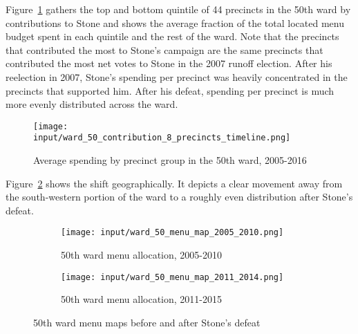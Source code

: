 Figure~\ref{fig:stone_spending_timeline} gathers the top and bottom quintile of 44 precincts in the 50th ward by contributions to Stone and shows the average fraction of the total located menu budget spent in each quintile and the rest of the ward.
Note that the precincts that contributed the most to Stone's campaign are the same precincts that contributed the most net votes to Stone in the 2007 runoff election.
After his reelection in 2007, Stone's spending per precinct was heavily concentrated in the precincts that supported him.
After his defeat, spending per precinct is much more evenly distributed across the ward.

\begin{figure}[H]
    \centering
    \texttt{[image: input/ward\_50\_contribution\_8\_precincts\_timeline.png]}
    \caption{Average spending by precinct group in the 50th ward, 2005-2016}
    \label{fig:stone_spending_timeline}
\end{figure}

Figure~\ref{fig:stone_spending_maps} shows the shift geographically.
It depicts a clear movement away from the south-western portion of the ward to a roughly even distribution after Stone's defeat.

\begin{figure}[H]
    \centering
    \begin{subfigure}[b]{0.45\textwidth} %
    \texttt{[image: input/ward\_50\_menu\_map\_2005\_2010.png]}
    \caption{50th ward menu allocation, 2005-2010}
    \end{subfigure}
    \hfill %
    \begin{subfigure}[b]{0.45\textwidth}
    \texttt{[image: input/ward\_50\_menu\_map\_2011\_2014.png]}
    \caption{50th ward menu allocation, 2011-2015}
    \end{subfigure}
    \caption{50th ward menu maps before and after Stone's defeat}
    \label{fig:stone_spending_maps}
\end{figure}

